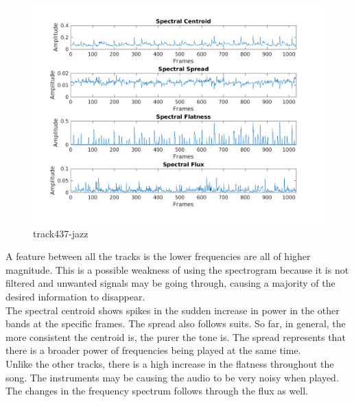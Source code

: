 \documentclass[11pt, a4paper]{article}
\begin{document}
\begin{figure}[H]
    \centering
    \includegraphics[width=\textwidth]{track437-jazz-spectral.png}
    \caption{track437-jazz}
\end{figure}

\pagebreak

A feature between all the tracks is the lower frequencies are all of higher magnitude. This is a possible weakness of using the spectrogram because it is not filtered and unwanted signals may be going through, causing a majority of the desired information to disappear. \\

The spectral centroid shows spikes in the sudden increase in power in the other bands at the specific frames. The spread also follows suits. So far, in general, the more consistent the centroid is, the purer the tone is. The spread represents that there is a broader power of frequencies being played at the same time. \\

Unlike the other tracks, there is a high increase in the flatness throughout the song. The instruments may be causing the audio to be very noisy when played. \\

The changes in the frequency spectrum follows through the flux as well. 

\pagebreak
\end{document}
